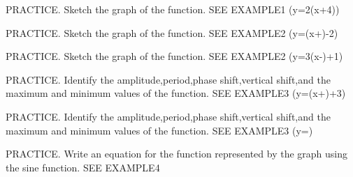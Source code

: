 \documentclass{article}
\newenvironment{practice}[2]{}{}        %
\newcommand{\answer}[1]{}               %
\newcommand{\placeholder}[2]{}          %
\begin{document}
\begin{practice}{17}{2}
PRACTICE. Sketch the graph of the function. SEE EXAMPLE1
(y=2\sin(x+\frac{3\pi}4))
\answer{Graph shown.}
\placeholder{graph}{Red2sin(x+3pi/4),x,y arrowed axes,O; x gridpi/2 labeled-pi,pi; y grid1/2 labeled-1,1,window-2pi..2pi,-2..2. Max(-pi/4,2),(7pi/4,2),min(-5pi/4,-2),(3pi/4,-2),end arrows.}
\end{practice}
\begin{practice}{18}{2}
PRACTICE. Sketch the graph of the function. SEE EXAMPLE2
(y=\cos(x+\frac{})-2)
\answer{Graph shown.}
\placeholder{graph}{Red(1/3)cos(x+pi/2)-2,x,y arrowed axes,O; x gridpi/2 labeled-pi,pi; y grid1/2 labeled-1,-2,window-2pi..2pi,-3..1. Max(-pi/2,-5/3),(3pi/2,-5/3),min(-3pi/2,-7/3),(pi/2,-7/3),end arrows.}
\end{practice}
\begin{practice}{19}{2}
PRACTICE. Sketch the graph of the function. SEE EXAMPLE2
(y=3\sin(x-\frac{})+1)
\answer{Graph shown.}
\placeholder{graph}{Red3sin(x-pi/6)+1,arrowed x,y axes,O; x gridpi labeled-2pi,2pi; y grid1 labeled-2,2,4,window-4pi..4pi,-3..5. Max2pi/3+2kpi,y4;min5pi/3+2kpi,y-2;fourcycles,end arrows.}
\end{practice}
\begin{practice}{20}{2}
PRACTICE. Identify the amplitude,period,phase shift,vertical shift,and the maximum and minimum values of the function. SEE EXAMPLE3
(y=\sin(x+\frac{})+3)
\answer{amplitude:(2/3);period:(2\pi);phase shift:left(pi/3) units;vertical shift:up3 units;maximum:(3\frac23);minimum:(2\frac13)}
\end{practice}
\begin{practice}{21}{2}
PRACTICE. Identify the amplitude,period,phase shift,vertical shift,and the maximum and minimum values of the function. SEE EXAMPLE3
(y=)
\answer{amplitude:(1/2);period:(\pi);phase shift:right(pi/4) units;vertical shift:down1 unit;maximum:(-1/2);minimum:(-1\frac12)}
\end{practice}
\begin{practice}{22}{2}
PRACTICE. Write an equation for the function represented by the graph using the sine function. SEE EXAMPLE4
\placeholder{graph}{Red sinusoid on grid,arrowed x,y axes,O; x gridpi/8 labels-pi,-pi/2,pi/2,pi,3pi/2,2pi; y grid1/2 labeled2;window-9pi/8..17pi/8,-1..5/2. Red marked points(0,3/2),(pi/2,1),(pi,1/2),period2pi,midline1,amplitude1/2,end arrows.}
\answer{(y=\frac12\sin(x-\frac{3\pi}2)+1)}
\end{practice}
\end{document}
